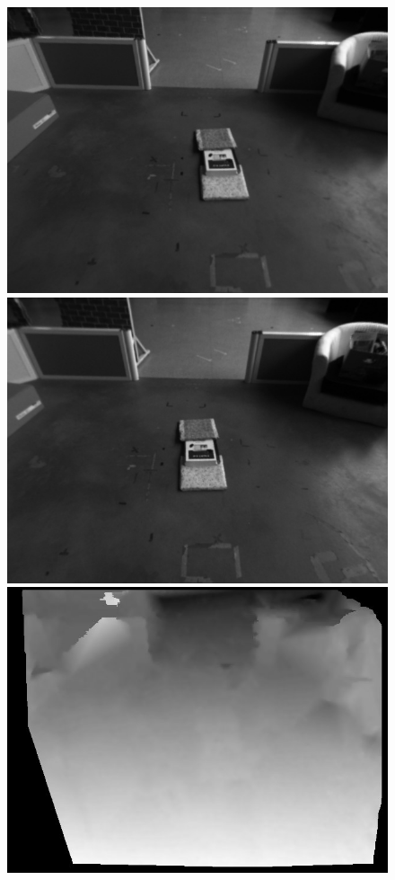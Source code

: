 \begin{figure}[h] \centering
\includegraphics[scale=0.25]{Chap6-3D-Reconstruction/left0001}
\hspace{0.2cm}
\includegraphics[scale=0.25]{Chap6-3D-Reconstruction/right0001}
\vspace{0.2cm}
\includegraphics[scale=0.37]{Chap6-3D-Reconstruction/left0001_disp}

\end{figure}

